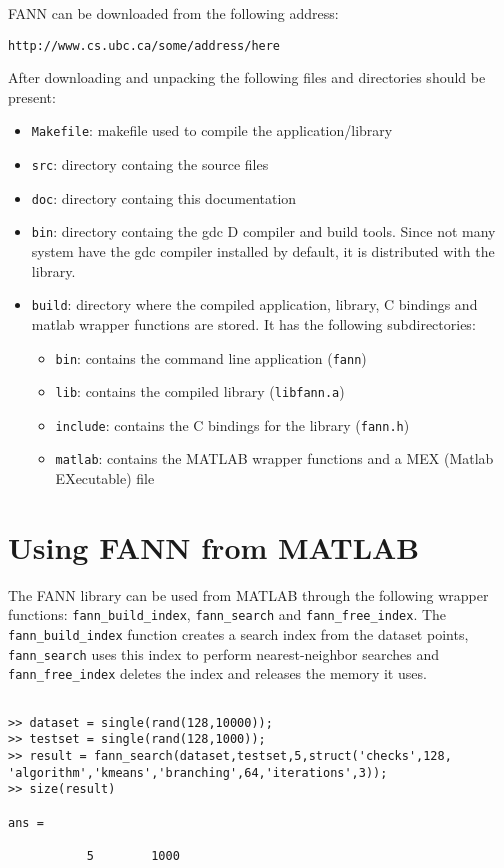 \documentclass[letter,10pt]{article}
\begin{document}
FANN can be downloaded from the following address:
\begin{center}
\texttt{http://www.cs.ubc.ca/some/address/here}
\end{center}

After downloading and unpacking the following files and directories should be present:
\begin{itemize}
\item \texttt{Makefile}: makefile used to compile the application/library
\item \texttt{src}: directory containg the source files
\item \texttt{doc}: directory containg this documentation
\item \texttt{bin}: directory containg the gdc D compiler and build tools. Since not many system have the gdc compiler installed by default, it is distributed with the library.
\item \texttt{build}: directory where the compiled application, library, C bindings and matlab wrapper functions are stored. It has the following subdirectories:
\begin{itemize}
\item \texttt{bin}: contains the command line application (\texttt{fann})
\item \texttt{lib}: contains the compiled library (\texttt{libfann.a})
\item \texttt{include}: contains the C bindings for the library (\texttt{fann.h})
\item \texttt{matlab}: contains the MATLAB wrapper functions and a MEX (Matlab EXecutable) file
\end{itemize}



\end{itemize}

\section{Using FANN from MATLAB}

The FANN library can be used from MATLAB through the following wrapper functions: \texttt{fann\_build\_index}, \texttt{fann\_search} and \texttt{fann\_free\_index}. The \texttt{fann\_build\_index} function creates a search index from the dataset points, \texttt{fann\_search} uses this index to perform nearest-neighbor searches and \texttt{fann\_free\_index} deletes the index and releases the memory it uses.

\begin{Verbatim}[fontsize=\footnotesize,frame=single]

>> dataset = single(rand(128,10000));
>> testset = single(rand(128,1000));
>> result = fann_search(dataset,testset,5,struct('checks',128,
'algorithm','kmeans','branching',64,'iterations',3));
>> size(result)

ans =

           5        1000

\end{Verbatim}
\end{document}
